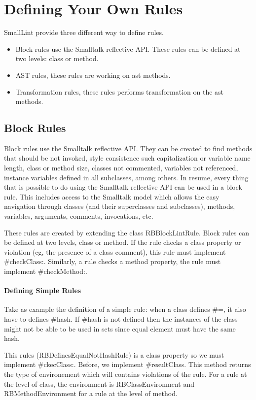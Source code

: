 \documentclass[a4paper,10pt,twoside]{book}
\begin{document}
\section{Defining Your Own Rules}
SmallLint provide three different way to define rules.
\begin{itemize}
	\item Block rules use the Smalltalk reflective API. These rules can be defined at two levels: class or method.
	\item AST rules, these rules are working on ast methods. 
	\item Transformation rules, these rules performs transformation on the ast methods.
\end{itemize}

\subsection{Block Rules}

Block rules use the Smalltalk reflective API. They can be created to find methods that should be not invoked, style consistence such capitalization or variable name length, class or method size, classes not commented, variables not referenced, instance variables defined in all subclasses, among others. In resume, every thing that is possible to do using the Smalltalk reflective API can be used in a block rule. This includes access to the Smalltalk model which allows the easy navigation through classes (and their superclasses and subclasses), methods, variables, arguments, comments, invocations, etc.

These rules are created by extending the class RBBlockLintRule.
 Block rules can be defined at two levels, class or method. If the rule checks a class property or violation (eg, the presence of a class comment), this rule must implement #checkClass:. Similarly, a rule checks  a method property, the rule must implement #checkMethod:.

\paragraph{Defining Simple Rules}
Take as example the definition of a simple rule:  when a class defines #=, it also have to defines  #hash. If #hash is not defined then the instances of the class might not be able to be used in sets since equal element must have the same hash.

This rules (RBDefinesEqualNotHashRule) is a class property so we must implement #ckecClass:. Before, we implement #resultClass. This method returns the type of environement which will contains violations of the rule. For a rule at the level of class, the environment is RBClassEnvironment and RBMethodEnvironment for  a rule at the level of method.
\end{document}
